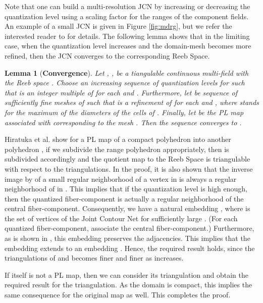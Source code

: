 \documentclass[twocolumn]{article}
\newtheorem{lemma}[theorem]{Lemma}
\newcommand{\figref}[1]{Figure \ref{fig:#1}}
\renewenvironment{proof}{{\bf Proof. }}{\hspace*{\fill}\bigskip\noindent}
\begin{document}
Note that one can build a multi-resolution JCN by increasing or
 decreasing the quantization level using a scaling factor for the
 ranges of the component fields. An example of a small JCN is given in \figref{mdrg}, but
 we refer the interested reader to \cite{2013-Carr-TVCG} for details.
 The following lemma shows that in the limiting case, when the
 quantization level increases and the domain-mesh becomes more
 refined, then the JCN converges to the corresponding Reeb Space.

\begin{lemma}[\textbf{Convergence}]
\label{lem:convergence}
Let , , be a tiangulable continuous 
multi-field with the Reeb space . 
Choose an increasing sequence of quantization levels  for  
such that  is an integer multiple of  for each  
and . 
Furthermore, let  be sequence of sufficiently fine meshes 
of  such that  is a refinement of  for each  and 
, where  stands for 
the maximum of the diameters of the cells of . 
Finally, let  be the PL map associated with  
corresponding to the mesh . 
Then the sequence  
converges to .
\end{lemma}
\noindent
\begin{proof} 
Hiratuka et al. \cite{Hiratuka2013} show
for a PL map  of a compact polyhedron  into
another polyhedron , if we subdivide the range polyhedron 
appropriately, then  is subdivided accordingly and the quotient map
 to the Reeb Space  is triangulable with respect
to the triangulations. In the proof, it is also shown that the inverse
image by  of a small regular neighborhood of a vertex  in
 is always a regular neighborhood of  in . This
implies that if the quantization level is high enough, then the
quantized fiber-component is actually a regular neighborhood of the
central fiber-component. Consequently, we have a natural embedding
, where  is the set of
vertices of the Joint Contour Net  for
sufficiently large . (For each quantized
fiber-component, associate the central fiber-component.) Furthermore,
as is shown in \cite{Hiratuka2013}, this embedding preserves the
adjacencies. This implies that the embedding  extends to
an embedding . Hence, the required result holds,
since the triangulations of  and 
becomes finer and finer as  increases.

If  itself is not a PL map, then we can consider its triangulation
 and obtain the required result for the triangulation. As
the domain  is compact, this implies the same consequence for the
original map  as well. This completes the proof.
\end{proof}
\end{document}
